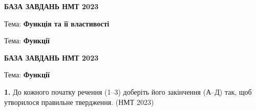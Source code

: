 \documentclass[14pt]{extarticle}
\newcommand{\nmtyear}[1]{\hfill{\small\color{yearcolor}(НМТ #1)}}
\begin{document}
\begin{center}
{\Large\textbf{\color{headerblue}БАЗА ЗАВДАНЬ НМТ 2023}}
\end{center}

\begin{center}
{\large Тема: \textbf{Функція та її властивості}}
\end{center}

\begin{center}
{\large Тема: \textbf{Функції}}
\end{center}

\vspace{0.5cm}

\begin{center}
{\Large\textbf{\color{headerblue}БАЗА ЗАВДАНЬ НМТ 2023}}
\end{center}

\begin{center}
{\large Тема: \textbf{Функції}}
\end{center}

\noindent\textbf{1.} До кожного початку речення (1--3) доберіть його закінчення (А--Д) так, щоб утворилося правильне твердження. \nmtyear{2023}

\vspace{0.3cm}
\end{document}
